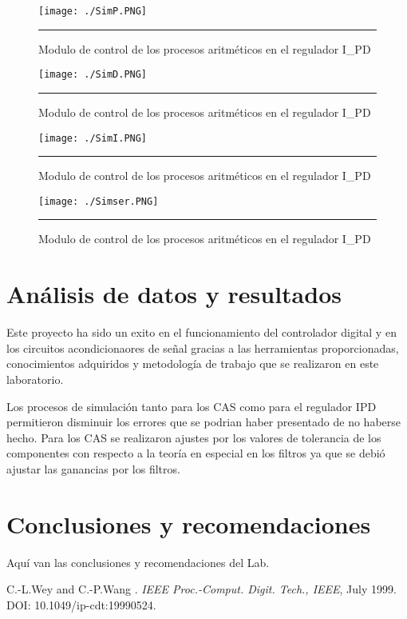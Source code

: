 \documentclass[12pt,a4paper]{article} %
\begin{document}
\begin{figure}[htbp]
  \centering
    \texttt{[image: ./SimP.PNG]}
    \rule{35em}{0.3pt}
  \caption[SimP]{Modulo de control de los procesos aritméticos en el regulador I\_PD}
  \label{fig:SimP}
\end{figure}

\begin{figure}[htbp]
  \centering
    \texttt{[image: ./SimD.PNG]}
    \rule{35em}{0.3pt}
  \caption[SimD]{Modulo de control de los procesos aritméticos en el regulador I\_PD}
  \label{fig:SimD}
\end{figure}

\begin{figure}[htbp]
  \centering
    \texttt{[image: ./SimI.PNG]}
    \rule{35em}{0.3pt}
  \caption[SimI]{Modulo de control de los procesos aritméticos en el regulador I\_PD}
  \label{fig:SimI}
\end{figure}

\begin{figure}[htbp]
  \centering
    \texttt{[image: ./Simser.PNG]}
    \rule{35em}{0.3pt}
  \caption[SimSer]{Modulo de control de los procesos aritméticos en el regulador I\_PD}
  \label{fig:SimSer}
\end{figure}

\section{Análisis de datos y resultados}

Este proyecto ha sido un exito en el funcionamiento del controlador digital y en los circuitos acondicionaores de señal gracias a las herramientas proporcionadas, conocimientos adquiridos y metodología de trabajo que se realizaron en este laboratorio.

Los procesos de simulación tanto para los CAS como para el regulador IPD permitieron disminuir los errores que se podrian haber presentado de no haberse hecho. Para los CAS se realizaron ajustes por los valores de tolerancia de los componentes con respecto a la teoría en especial en los filtros ya que se debió ajustar las ganancias por los filtros.






\section{Conclusiones y recomendaciones}

Aquí van las conclusiones y recomendaciones del Lab.

\begin{thebibliography}{3}


C.-L.Wey and C.-P.Wang
.
\newblock \emph{IEEE Proc.-Comput. Digit. Tech., IEEE}, July 1999.
\newblock DOI: 10.1049/ip-cdt:19990524.

\end{thebibliography}
\end{document}
